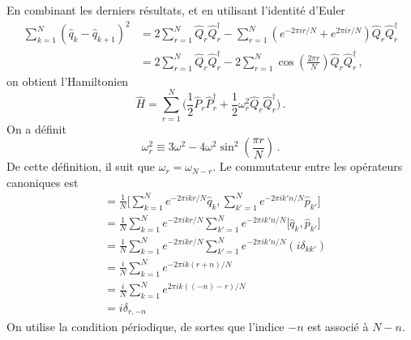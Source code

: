 \documentclass{article}
\numberwithin{equation}{section}
\theoremstyle{solution}
\begin{document}
En combinant les derniers résultats, et en utilisant l'identité d'Euler
\begin{align*}
        \sum_{k=1}^{N}(\hat{q}_k - \hat{q}_{k+1})^{2} &= 2\sum_{r=1}^{N}\hat{Q}_r\hat{Q}^{\dagger}_r - \sum_{r=1}^{N}( e^{-2\pi i r / N} + e^{2\pi i r / N})\hat{Q}_r\hat{Q}^{\dagger}_r \\
                                                      &= 2\sum_{r=1}^{N}\hat{Q}_r\hat{Q}^{\dagger}_r - 2\sum_{r=1}^{N} \cos \left( \frac{2 \pi r}{N} \right)\hat{Q}_r\hat{Q}^{\dagger}_r \, ,
\end{align*} 
on obtient l'Hamiltonien 
\begin{equation}
        \label{eq:H}
        \hat{H} = \sum_{r=1}^N \bigg(\frac{1}{2}\hat{P}_r\hat{P}^{\dagger}_r + \frac{1}{2}\omega_r^{2}\hat{Q}_r \hat{Q}^{\dagger}_r\bigg) \, .
\end{equation} 
On a définit
\begin{equation}
        \omega_r^{2} \equiv 3\omega^{2} - 4\omega^2 \sin^2 \left( \frac{\pi r}{N} \right) \, .
\end{equation} 
De cette définition, il suit que $\omega_r = \omega_{N-r}$.
Le commutateur entre les opérateurs canoniques est
\begingroup
\allowdisplaybreaks
\begin{align*}
        [\hat{Q}_r, \hat{P}_n] &= \frac{1}{N}\bigg[\sum_{k=1}^{N} e^{-2\pi i kr / N}\hat{q}_k , \sum_{k'=1}^{N} e^{-2\pi i k'n / N}\hat{p}_{k'} \bigg] \\
                             &= \frac{1}{N}\sum_{k=1}^{N}e^{-2\pi i kr / N}\sum_{k'=1}^{N} e^{-2\pi i k'n / N}\bigg[\hat{q}_k , \hat{p}_{k'} \bigg] \\
                             &= \frac{1}{N}\sum_{k=1}^{N}e^{-2\pi i kr / N}\sum_{k'=1}^{N} e^{-2\pi i k'n / N}(i\delta_{k k'}) \\
                             &= \frac{i}{N}\sum_{k=1}^{N}e^{-2\pi i k(r + n) / N}\\
                             &= \frac{i}{N}\sum_{k=1}^{N}e^{2\pi i k((-n) - r) / N}\\
                             &= i \delta_{r,-n}
\end{align*}
\endgroup
On utilise la condition périodique, de sortes que l'indice $-n$ est associé à $N-n$. 
\end{document}
